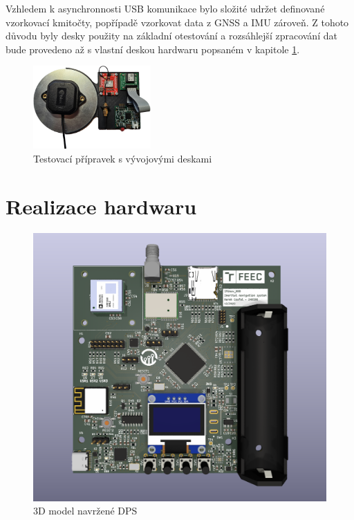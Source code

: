 Vzhledem k asynchronnosti \ac{USB} komunikace bylo složité udržet definované vzorkovací kmitočty, popřípadě vzorkovat data z \ac{GNSS} a \ac{IMU} zároveň. Z tohoto důvodu byly desky použity na základní otestování a rozsáhlejší zpracování dat bude provedeno až s vlastní deskou hardwaru popsaném v kapitole \ref{hardware}.
\begin{figure}[h] 
    \centering
    \includegraphics[width=0.4\textwidth]{obrazky/devBoards}
    \caption{Testovací přípravek s vývojovými deskami}
    \label{fig:devBoards}
\end{figure}

\chapter{Realizace hardwaru} \label{hardware}
\begin{figure}[h]
    \centering
    \includegraphics[width=\textwidth]{KiCad/3Dboard}
    \caption{3D model navržené DPS}
    \label{fig:3Dboard}
\end{figure}

